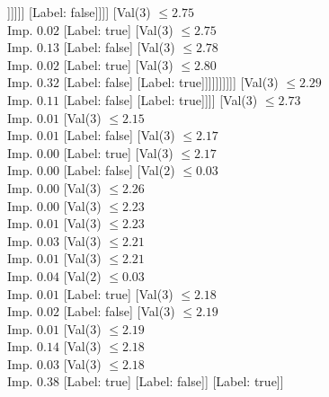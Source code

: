 \documentclass[margin=10pt]{standalone}
\begin{document}
\begin{forest}
																				[Label: true]
																				[Val($3$) $ \leq 2.64$ \\ Imp. $0.50$
																					[Label: false]
																					[Label: true]]]]]]
																[Label: false]]]]
													[Val($3$) $ \leq 2.75$ \\ Imp. $0.02$
														[Label: true]
														[Val($3$) $ \leq 2.75$ \\ Imp. $0.13$
															[Label: false]
															[Val($3$) $ \leq 2.78$ \\ Imp. $0.02$
																[Label: true]
																[Val($3$) $ \leq 2.80$ \\ Imp. $0.32$
																	[Label: false]
																	[Label: true]]]]]]]]]]
								[Val($3$) $ \leq 2.29$ \\ Imp. $0.11$
									[Label: false]
									[Label: true]]]]
						[Val($3$) $ \leq 2.73$ \\ Imp. $0.01$
							[Val($3$) $ \leq 2.15$ \\ Imp. $0.01$
								[Label: false]
								[Val($3$) $ \leq 2.17$ \\ Imp. $0.00$
									[Label: true]
									[Val($3$) $ \leq 2.17$ \\ Imp. $0.00$
										[Label: false]
										[Val($2$) $ \leq 0.03$ \\ Imp. $0.00$
											[Val($3$) $ \leq 2.26$ \\ Imp. $0.00$
												[Val($3$) $ \leq 2.23$ \\ Imp. $0.01$
													[Val($3$) $ \leq 2.23$ \\ Imp. $0.03$
														[Val($3$) $ \leq 2.21$ \\ Imp. $0.01$
															[Val($3$) $ \leq 2.21$ \\ Imp. $0.04$
																[Val($2$) $ \leq 0.03$ \\ Imp. $0.01$
																	[Label: true]
																	[Val($3$) $ \leq 2.18$ \\ Imp. $0.02$
																		[Label: false]
																		[Val($3$) $ \leq 2.19$ \\ Imp. $0.01$
																			[Val($3$) $ \leq 2.19$ \\ Imp. $0.14$
																				[Val($3$) $ \leq 2.18$ \\ Imp. $0.03$
																					[Val($3$) $ \leq 2.18$ \\ Imp. $0.38$
																						[Label: true]
																						[Label: false]]
																					[Label: true]]

\end{forest}
\end{document}
